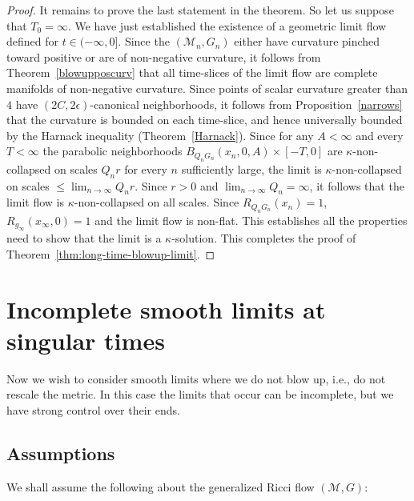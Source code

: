 \begin{proof}
It remains to prove the last statement in the theorem. So let us
suppose that $T_0=\infty$. We have just established the existence of
a geometric limit flow defined for $t\in (-\infty,0]$.  Since the
$({\mathcal M}_n,G_n)$ either have curvature pinched toward positive
or are of non-negative curvature, it follows from
Theorem~\ref{blowupposcurv} that all time-slices of the limit flow
are complete manifolds of non-negative curvature. Since points of
scalar curvature greater than $4$ have $(2C,2\epsilon)$-canonical
neighborhoods, it follows from Proposition~\ref{narrows} that the
curvature is bounded on each time-slice, and hence universally
bounded by the Harnack inequality (Theorem~\ref{Harnack}). Since for
any $A<\infty$ and every $T<\infty$ the parabolic neighborhoods
$B_{Q_nG_n}(x_n,0,A)\times [-T,0]$ are $\kappa$-non-collapsed on
scales $Q_nr$ for every $n$ sufficiently large,  the limit  is
$\kappa$-non-collapsed on scales $\le \lim_{n\rightarrow
\infty}Q_nr$. Since  $r>0$ and $\lim_{n\rightarrow
\infty}Q_n=\infty$, it follows that the limit flow is
$\kappa$-non-collapsed on all scales. Since $R_{Q_n G_n}(x_n)=1$,
$R_{g_\infty}(x_\infty,0)=1$ and the limit flow is non-flat. This
establishes all the properties need to show that the limit is a
$\kappa$-solution. This completes the proof of
Theorem~\ref{thm:long-time-blowup-limit}.
\end{proof}


\section{Incomplete smooth limits at singular times}

Now we wish to consider smooth limits where we do not blow up, i.e.,
do not rescale the metric. In this case the limits that occur can be
incomplete, but we have strong control over their ends.




\subsection{Assumptions}

We shall assume the following about the generalized Ricci flow
$({\mathcal M},G)$:

